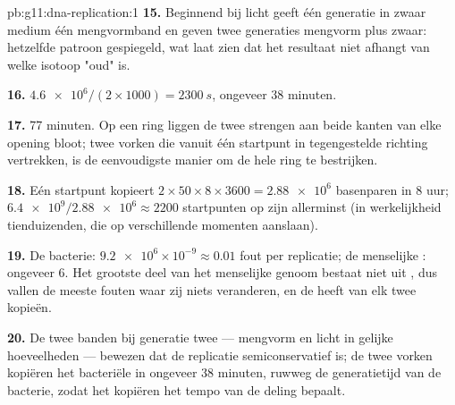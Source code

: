 \begin{solution}{pb:g11:dna-replication:1}
\textbf{15.} Beginnend bij licht geeft één generatie in zwaar medium één
mengvormband en geven twee generaties mengvorm plus zwaar: hetzelfde
patroon gespiegeld, wat laat zien dat het resultaat niet afhangt van welke
isotoop "oud" is.

\textbf{16.} $\num{4.6e6}/(2 \times 1000) = \qty{2300}{s}$, ongeveer
38 minuten.

\textbf{17.} 77 minuten. Op een ring liggen de twee strengen aan beide
kanten van elke opening bloot; twee vorken die vanuit één startpunt in
tegengestelde richting vertrekken, is de eenvoudigste manier om de hele
ring te bestrijken.

\textbf{18.} Eén startpunt kopieert $2 \times 50 \times 8 \times 3600 =
\num{2.88e6}$ basenparen in 8 uur; $\num{6.4e9}/\num{2.88e6}
\approx 2200$ startpunten op zijn allerminst (in werkelijkheid
tienduizenden, die op verschillende momenten aanslaan).

\textbf{19.} De bacterie: $\num{9.2e6} \times 10^{-9} \approx 0.01$ fout
per replicatie; de menselijke : ongeveer 6. Het grootste deel van het
menselijke genoom bestaat niet uit , dus vallen de meeste fouten
waar zij niets veranderen, en de  heeft van elk  twee kopieën.

\textbf{20.} De twee banden bij generatie twee --- mengvorm en licht in
gelijke hoeveelheden --- bewezen dat de replicatie semiconservatief is;
de twee vorken kopiëren het bacteriële  in ongeveer 38 minuten,
ruwweg de generatietijd van de bacterie, zodat het kopiëren het tempo van
de deling bepaalt.
\end{solution}
